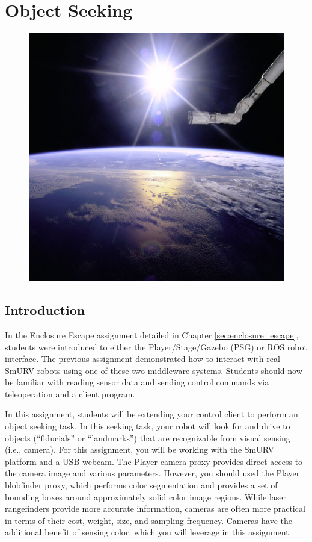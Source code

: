 

\chapter{Object Seeking}
\label{sec:object_seeking}

\begin{figure}[!h]
\centering
\includegraphics[width=0.9\columnwidth]{figures/6_619px-Robot_Arm_Over_Earth_with_Sunburst.jpg}
\end{figure}

\newpage

\section{Introduction}

In the Enclosure Escape assignment detailed in Chapter \ref{sec:enclosure_escape}, students were introduced to either the 
Player/Stage/Gazebo (PSG) or ROS robot interface.  The previous assignment demonstrated how to interact with real SmURV robots using 
one of these two middleware systems.  Students should now be familiar with reading sensor data and sending control commands via teleoperation 
and a client program. 

In this assignment, students will be extending your control client to perform an object seeking task.  In this seeking task, your robot will 
look for and drive to objects (``fiducials'' or ``landmarks'') that are recognizable from visual sensing (i.e., camera).  For this 
assignment, you will be working with the SmURV platform and a USB webcam.  The Player camera proxy provides 
direct access to the camera image and various parameters.  However, you should used the Player blobfinder proxy, which performs color 
segmentation and provides a set of bounding boxes around approximately solid color image regions.  While laser rangefinders provide more 
accurate information, cameras are often more practical in terms of their cost, weight, size, and sampling frequency.  Cameras have the 
additional benefit of sensing color, which you will leverage in this assignment. 

